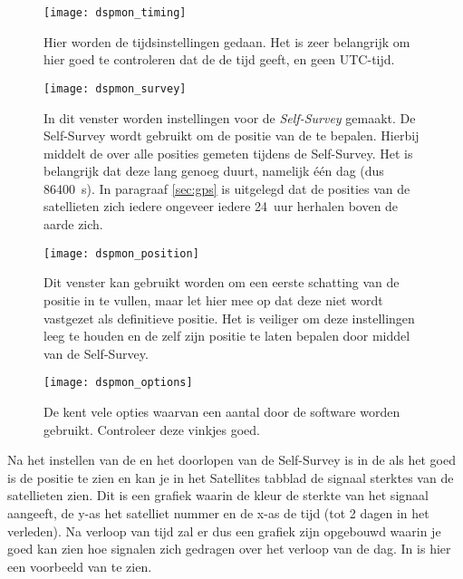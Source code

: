 \begin{figure}
    \centering
    \texttt{[image: dspmon\_timing]}
    \caption{Hier worden de tijdsinstellingen gedaan. Het is zeer
    belangrijk om hier goed te controleren dat de \gps de \gps tijd
    geeft, en geen UTC-tijd.}
    \label{fig:dspmon_timing}
\end{figure}

\begin{figure}
    \centering
    \texttt{[image: dspmon\_survey]}
    \caption{In dit venster worden instellingen voor de
             \emph{Self-Survey} gemaakt. De Self-Survey wordt gebruikt
             om de positie van de \gps te bepalen. Hierbij middelt de
             \gps over alle posities gemeten tijdens de Self-Survey. Het
             is belangrijk dat deze lang genoeg duurt, namelijk één dag
             (dus \SI{86400}{\second}). In paragraaf \ref{sec:gps} is
             uitgelegd dat de posities van de \gps satellieten zich
             iedere ongeveer iedere \SI{24}{uur} herhalen boven de aarde
             zich.}
    \label{fig:dspmon_survey}
\end{figure}
   
\begin{figure}
    \centering
    \texttt{[image: dspmon\_position]}
    \caption{Dit venster kan gebruikt worden om een eerste schatting van
    de positie in te vullen, maar let hier mee op dat deze niet wordt
    vastgezet als definitieve positie. Het is veiliger om deze
    instellingen leeg te houden en de \gps zelf zijn positie te laten
    bepalen door middel van de Self-Survey.}
    \label{fig:dspmon_position}
\end{figure}

\begin{figure}
    \centering
    \texttt{[image: dspmon\_options]}
    \caption{De \gps kent vele opties waarvan een aantal door de \hisparc
    software worden gebruikt. Controleer deze vinkjes goed.}
    \label{fig:dspmon_options}
\end{figure}

Na het instellen van de \gps en het doorlopen van de Self-Survey is in
de \hisparc \daq als het goed is de \gps positie te zien en kan je in
het Satellites tabblad de signaal sterktes van de satellieten zien. Dit
is een grafiek waarin de kleur de sterkte van het signaal aangeeft, de
y-as het satelliet nummer en de x-as de tijd (tot 2 dagen in het
verleden). Na verloop van tijd zal er dus een grafiek zijn opgebouwd
waarin je goed kan zien hoe \gps signalen zich gedragen over het verloop
van de dag. In  is hier een voorbeeld
van te zien.

